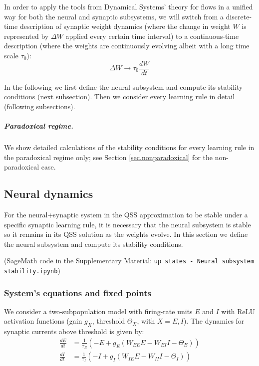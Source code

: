 \documentclass[twocolumn]{article}
\newcommand{\EE}{\mathit{EE}}
\newcommand{\EI}{\mathit{EI}}
\newcommand{\IE}{\mathit{IE}}
\newcommand{\II}{\mathit{II}}
\begin{document}
In order to apply the tools from Dynamical Systems' theory for flows in a unified way for both the neural and synaptic subsystems, we will switch from a discrete-time description of synaptic weight dynamics (where the change in weight $W$ is represented by $\Delta W$ applied every certain time interval) to a continuous-time description (where the weights are continuously evolving albeit with a long time scale $\tau_0$):
\begin{displaymath}
\Delta W \rightarrow \tau_0 \frac{dW}{dt}
\end{displaymath}

In the following we first define the neural subsystem and compute its stability conditions (next subsection). Then we consider every learning rule in detail (following subsections).

\subparagraph{Paradoxical regime.} We show detailed calculations of the stability conditions for every learning rule in the paradoxical regime only; see Section \ref{sec.nonparadoxical} for the non-paradoxical case.



\subsection{Neural dynamics}

For the neural+synaptic system in the QSS approximation to be stable under a specific synaptic learning rule, it is necessary that the neural subsystem is stable so it remains in its QSS solution as the weights evolve. In this section we define the neural subsystem and compute its stability conditions.

(SageMath code in the Supplementary Material: {\tt up states - Neural subsystem stability.ipynb})


\subsubsection{System's equations and fixed points}

We consider a two-subpopulation model with firing-rate units $E$ and $I$ with ReLU activation functions (gain $g_X$, threshold $\Theta_X$, with $X=E,I$). The dynamics for synaptic currents above threshold is given by:
\begin{equation}
\begin{aligned}
\frac{dE}{dt} & = \frac{1}{\tau_E}(-E + g_E(W_{\EE}E - W_{\EI}I - \Theta_E)) \\
\frac{dI}{dt} & = \frac{1}{\tau_I}(-I + g_I(W_{\IE}E - W_{\II}I - \Theta_I))
\end{aligned}
\label{eq.neural}
\end{equation}
\end{document}
